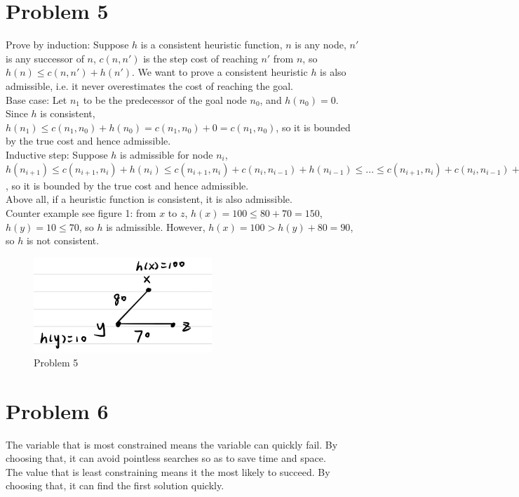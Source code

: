 \documentclass{article}
\begin{document}
\section*{Problem 5}
Prove by induction: Suppose $h$ is a consistent heuristic function, $n$ is any node, $n'$ is any successor of $n$, $c(n,n')$ is the step cost of reaching $n'$ from $n$, so $h(n) \leq c(n,n')+h(n')$. We want to prove a consistent heuristic $h$ is also admissible, i.e. it never overestimates the cost of reaching the goal.\\
Base case: Let $n_1$ to be the predecessor of the goal node $n_0$, and $h(n_0)=0$. Since $h$ is consistent, $h(n_1) \leq c(n_1,n_0)+h(n_0) = c(n_1,n_0) + 0 = c(n_1,n_0)$, so it is bounded by the true cost and hence admissible.\\
Inductive step: Suppose $h$ is admissible for node $n_{i}$, $h(n_{i+1}) \leq c(n_{i+1},n_{i})+h(n_{i}) \leq c(n_{i+1},n_{i}) + c(n_{i},n_{i-1})+ h(n_{i-1}) \leq ... \leq c(n_{i+1},n_{i}) + c(n_{i},n_{i-1})+ ... + c(n_1,n_0) + h(n_0) \leq \sum_{j=1}^{i+1} c(n_j,n_{j-1})$, so it is bounded by the true cost and hence admissible.\\
Above all, if a heuristic function is consistent, it is also admissible.\\
Counter example see figure 1: from $x$ to $z$, $h(x) = 100 \leq 80+70=150$, $h(y) = 10 \leq 70$, so $h$ is admissible. However, $h(x) = 100 > h(y) + 80 = 90$, so $h$ is not consistent.
\begin{figure}
        \centering
        \includegraphics[width=0.6\textwidth]{5.jpg}
        \caption{Problem 5}
\end{figure}

\section*{Problem 6}
The variable that is most constrained means the variable can quickly fail. By choosing that, it can avoid pointless searches so as to save time and space.\\
The value that is least constraining means it the most likely to succeed. By choosing that, it can find the first solution quickly.
\end{document}
